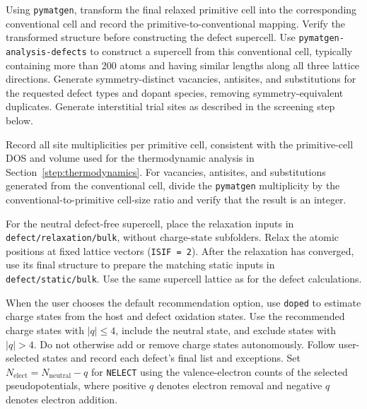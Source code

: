 \documentclass[aip,jap,reprint,amsmath,amssymb]{revtex4-2}
\begin{document}
Using \texttt{pymatgen}\cite{Ong2013}, transform the final relaxed primitive cell into the corresponding conventional cell and record the primitive-to-conventional mapping. Verify the transformed structure before constructing the defect supercell. Use \texttt{pymatgen-analysis-defects}\cite{Shen2024} to construct a supercell from this conventional cell, typically containing more than 200 atoms and having similar lengths along all three lattice directions. Generate symmetry-distinct vacancies, antisites, and substitutions for the requested defect types and dopant species, removing symmetry-equivalent duplicates. Generate interstitial trial sites as described in the screening step below.

Record all site multiplicities per primitive cell, consistent with the primitive-cell DOS and volume used for the thermodynamic analysis in Section~\ref{step:thermodynamics}. For vacancies, antisites, and substitutions generated from the conventional cell, divide the \texttt{pymatgen} multiplicity by the conventional-to-primitive cell-size ratio and verify that the result is an integer.

For the neutral defect-free supercell, place the relaxation inputs in \texttt{defect/\allowbreak relaxation/\allowbreak bulk}, without charge-state subfolders. Relax the atomic positions at fixed lattice vectors (\texttt{ISIF = 2}). After the relaxation has converged, use its final structure to prepare the matching static inputs in \texttt{defect/\allowbreak static/\allowbreak bulk}. Use the same supercell lattice as for the defect calculations.

When the user chooses the default recommendation option, use \texttt{doped}\cite{Kavanagh2024} to estimate charge states from the host and defect oxidation states. Use the recommended charge states with $|q|\leq4$, include the neutral state, and exclude states with $|q|>4$. Do not otherwise add or remove charge states autonomously. Follow user-selected states and record each defect's final list and exceptions. Set $N_{\mathrm{elect}} = N_{\mathrm{neutral}} - q$ for \texttt{NELECT} using the valence-electron counts of the selected pseudopotentials, where positive $q$ denotes electron removal and negative $q$ denotes electron addition.
\end{document}
